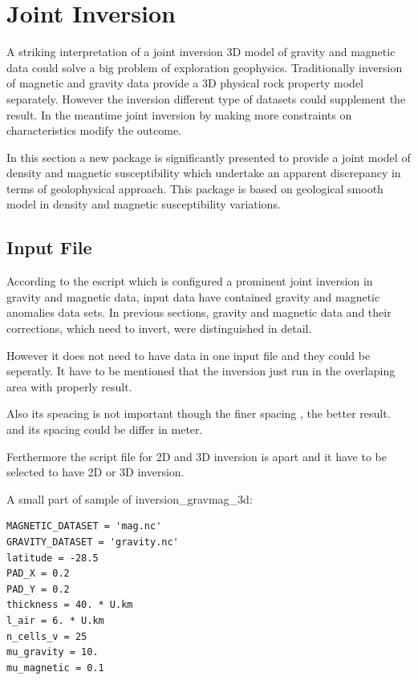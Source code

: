 \chapter{Joint Inversion}\label{Chp:cook:joint inversion}


A striking interpretation of a joint inversion 3D model of gravity and magnetic data could solve a big problem of exploration geophysics. Traditionally inversion of magnetic and gravity data provide a 3D physical rock property model separately. However the inversion different type of datasets could supplement the result. In the meantime joint inversion by making more constraints on characteristics modify the outcome.

In this section a new package is significantly presented to provide a joint model of density and magnetic susceptibility which undertake an apparent discrepancy in terms of geolophysical approach. This package is based on geological smooth model in density and magnetic susceptibility variations.



\section{Input File} 

According to the escript which is configured a prominent joint inversion in gravity and magnetic data, input data have contained gravity and magnetic anomalies data sets. In previous sections, gravity and magnetic data and their corrections, which need to invert, were distinguished in detail.

However it does not need to have data in one input file and they could be seperatly. It have to be mentioned that the inversion just run in the overlaping area with properly result.

Also its speacing is not important though the finer spacing , the better result. and its spacing could be differ in meter. 

Ferthermore the script file for 2D and 3D inversion is apart and it have to be selected to have 2D or 3D inversion.

A small part of sample of inversion_gravmag_3d:

\begin{verbatim}
MAGNETIC_DATASET = 'mag.nc'
GRAVITY_DATASET = 'gravity.nc'
latitude = -28.5
PAD_X = 0.2
PAD_Y = 0.2
thickness = 40. * U.km
l_air = 6. * U.km
n_cells_v = 25
mu_gravity = 10.
mu_magnetic = 0.1
\end{verbatim}

